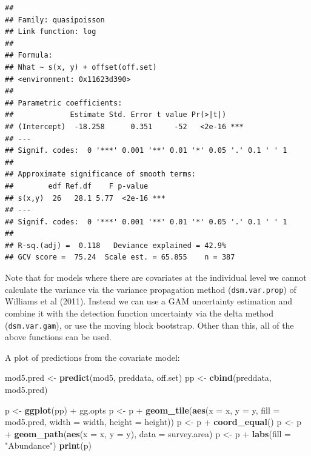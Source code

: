 \documentclass[]{article}
\newenvironment{Shaded}{}{}
\newcommand{\KeywordTok}[1]{\textcolor[rgb]{0.00,0.44,0.13}{\textbf{{#1}}}}
\newcommand{\DataTypeTok}[1]{\textcolor[rgb]{0.56,0.13,0.00}{{#1}}}
\newcommand{\StringTok}[1]{\textcolor[rgb]{0.25,0.44,0.63}{{#1}}}
\newcommand{\NormalTok}[1]{{#1}}
\begin{document}
\begin{verbatim}
## 
## Family: quasipoisson 
## Link function: log 
## 
## Formula:
## Nhat ~ s(x, y) + offset(off.set)
## <environment: 0x11623d390>
## 
## Parametric coefficients:
##             Estimate Std. Error t value Pr(>|t|)    
## (Intercept)  -18.258      0.351     -52   <2e-16 ***
## ---
## Signif. codes:  0 '***' 0.001 '**' 0.01 '*' 0.05 '.' 0.1 ' ' 1
## 
## Approximate significance of smooth terms:
##        edf Ref.df    F p-value    
## s(x,y)  26   28.1 5.77  <2e-16 ***
## ---
## Signif. codes:  0 '***' 0.001 '**' 0.01 '*' 0.05 '.' 0.1 ' ' 1
## 
## R-sq.(adj) =  0.118   Deviance explained = 42.9%
## GCV score =  75.24  Scale est. = 65.855    n = 387
\end{verbatim}

Note that for models where there are covariates at the individual level
we cannot calculate the variance via the variance propagation method
(\texttt{dsm.var.prop}) of Williams et al (2011). Instead we can use a
GAM uncertainty estimation and combine it with the detection function
uncertainty via the delta method (\texttt{dsm.var.gam}), or use the
moving block bootstrap. Other than this, all of the above functions can
be used.

A plot of predictions from the covariate model:

\begin{Shaded}
\begin{Highlighting}[]
\NormalTok{mod5.pred <-}\StringTok{ }\KeywordTok{predict}\NormalTok{(mod5, preddata, off.set)}
\NormalTok{pp <-}\StringTok{ }\KeywordTok{cbind}\NormalTok{(preddata, mod5.pred)}

\NormalTok{p <-}\StringTok{ }\KeywordTok{ggplot}\NormalTok{(pp) +}\StringTok{ }\NormalTok{gg.opts}
\NormalTok{p <-}\StringTok{ }\NormalTok{p +}\StringTok{ }\KeywordTok{geom_tile}\NormalTok{(}\KeywordTok{aes}\NormalTok{(}\DataTypeTok{x =} \NormalTok{x, }\DataTypeTok{y =} \NormalTok{y, }\DataTypeTok{fill =} \NormalTok{mod5.pred, }\DataTypeTok{width =} \NormalTok{width, }\DataTypeTok{height =} \NormalTok{height))}
\NormalTok{p <-}\StringTok{ }\NormalTok{p +}\StringTok{ }\KeywordTok{coord_equal}\NormalTok{()}
\NormalTok{p <-}\StringTok{ }\NormalTok{p +}\StringTok{ }\KeywordTok{geom_path}\NormalTok{(}\KeywordTok{aes}\NormalTok{(}\DataTypeTok{x =} \NormalTok{x, }\DataTypeTok{y =} \NormalTok{y), }\DataTypeTok{data =} \NormalTok{survey.area)}
\NormalTok{p <-}\StringTok{ }\NormalTok{p +}\StringTok{ }\KeywordTok{labs}\NormalTok{(}\DataTypeTok{fill =} \StringTok{"Abundance"}\NormalTok{)}
\KeywordTok{print}\NormalTok{(p)}
\end{Highlighting}
\end{Shaded}
\end{document}
